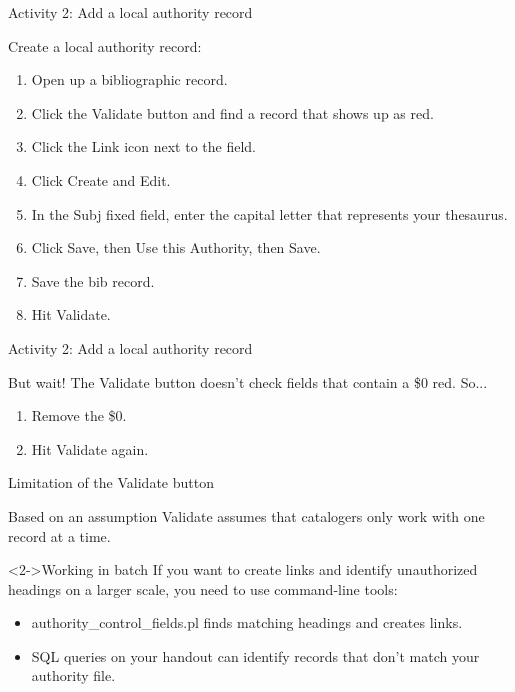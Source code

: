 \documentclass{beamer}
\begin{document}
\begin{frame}{Activity 2: Add a local authority record}

Create a local authority record:
\begin{enumerate}
 \item Open up a bibliographic record.
 \item Click the Validate button and find a record that shows up as red.
 \item Click the Link icon next to the field.
 \item Click Create and Edit.
 \item In the Subj fixed field, enter the capital letter that represents your thesaurus.
 \item Click Save, then Use this Authority, then Save.
 \item Save the bib record.
 \item Hit Validate.
\end{enumerate}

\end{frame}


\begin{frame}{Activity 2: Add a local authority record}

But wait!  The Validate button doesn't check fields that contain a \$0 red.  So...
\begin{enumerate}
 \item Remove the \$0.
 \item Hit Validate again.
\end{enumerate}

\end{frame}

\begin{frame}{Limitation of the Validate button}
\begin{block}{Based on an assumption}
 Validate assumes that catalogers only work with one record at a time.
 \end{block}
 \begin{block}<2->{Working in batch}
  If you want to create links and identify unauthorized headings on a larger scale, you need to use command-line tools:
  \begin{itemize}
   \item authority\_control\_fields.pl finds matching headings and creates links.
   \item SQL queries on your handout can identify records that don't match your authority file.
  \end{itemize}


 \end{block}

\end{frame}
\end{document}
